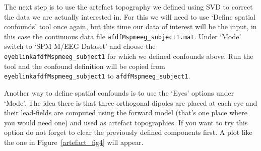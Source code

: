 The next step is to use the artefact topography we defined using SVD to correct the data we are actually interested in. For this we will need to use `Define spatial confounds' tool once again, but this time our data of interest will be the input, in this case the continuous data file \texttt{afdfMspmeeg\_subject1.mat}. Under `Mode' switch to `SPM M/EEG Dataset' and choose the \texttt{eyeblinkafdfMspmeeg\_subject1} for which we defined confounds above. Run the tool and the confound definition will be copied from \texttt{eyeblinkafdfMspmeeg\_subject1} to \texttt{afdfMspmeeg\_subject1}.

Another way to define spatial confounds is to use the `Eyes' options under `Mode'. The idea there is that three orthogonal dipoles are placed at each eye and their lead-fields are computed using the forward model (that's one place where you would need one) and used as artefact topographies. If you want to try this option do not forget to clear the previously defined components first. A plot like the one in Figure~\ref{artefact_fig4} will appear.

